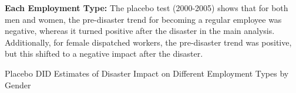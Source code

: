 \documentclass[serif, aspectratio=169]{beamer}
\newcommand{\returnbutton}[2]{%
  \vspace{-1.0cm}  %
  \hfill  %
  \hyperlink{#1}{%
    {\footnotesize\beamerbutton{#2}}%
  }%
  \vspace{0.3cm}  %
}
\begin{document}
\begin{frame}[label=different_types_placebo]

\textbf{Each Employment Type:} The placebo test (2000-2005) shows that for both men and women, the pre-disaster trend for becoming a regular employee was negative, whereas it turned positive after the disaster in the main analysis. Additionally, for female dispatched workers, the pre-disaster trend was positive, but this shifted to a negative impact after the disaster. 

\vspace{-1.5cm}
\returnbutton{different_types}{Return}
\vspace{2.6cm}

\begin{table}[htbp]
\centering
\caption{Placebo DID Estimates of Disaster Impact on Different Employment Types by Gender}

\vspace{-0.2cm}


\end{table}
\end{frame}
\end{document}
